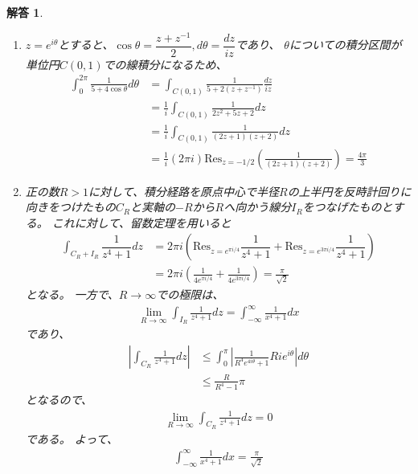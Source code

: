 \documentclass{ltjsarticle}
\newtheorem{ans}{解答}
\begin{document}
\begin{ans}
    \begin{enumerate}
        \item $z=e^{i\theta}$とすると、$\cos\theta=\dfrac{z+z^{-1}}{2}, d\theta=\dfrac{dz}{iz}$であり、
        $\theta$についての積分区間が単位円$C(0,1)$での線積分になるため、
        \begin{align*}
            \displaystyle\int^{2\pi}_0\frac{1}{5+4\cos\theta}d\theta
            &=\int_{C(0,1)}\frac{1}{5+2(z+z^{-1})}\frac{dz}{iz}\\
            &=\frac{1}{i}\int_{C(0,1)}\frac{1}{2z^2+5z+2}dz\\
            &=\frac{1}{i}\int_{C(0,1)}\frac{1}{(2z+1)(z+2)}dz\\
            &=\frac{1}{i}(2\pi i)\mathrm{Res}_{z=-1/2}(\frac{1}{(2z+1)(z+2)})=\frac{4\pi}{3}
        \end{align*}
        \item 正の数$R>1$に対して、積分経路を原点中心で半径$R$の上半円を反時計回りに向きをつけたもの$C_R$と実軸の$-R$から$R$へ向かう線分$I_R$をつなげたものとする。
        これに対して、留数定理を用いると
        \begin{align*}
            \int_{C_R+I_R}\dfrac{1}{z^4+1}dz&=2\pi i\left(\mathrm{Res}_{z=e^{\pi i/4}}\dfrac{1}{z^4+1}+\mathrm{Res}_{z=e^{3\pi i/4}}\dfrac{1}{z^4+1}\right)\\
            &=2\pi i(\frac{1}{4e^{\pi i/4}}+\frac{1}{4e^{3\pi i/4}})=\frac{\pi}{\sqrt{2}}
        \end{align*}
        となる。
        一方で、$R\to\infty$での極限は、
        \begin{align*}
            \lim_{R\to\infty}\int_{I_R}\frac{1}{z^4+1}dz=\int_{-\infty}^{\infty}\frac{1}{x^4+1}dx
        \end{align*}
        であり、
        \begin{align*}
            \left\lvert\int_{C_R}\frac{1}{z^4+1}dz\right\rvert
            &\leq\int_0^\pi\left\lvert\frac{1}{R^4e^{4i\theta}+1}Rie^{i\theta}\right\rvert d\theta\\
            &\leq\frac{R}{R^4-1}\pi
        \end{align*}
        となるので、
        \begin{align*}
            \lim_{R\to\infty}\int_{C_R}\frac{1}{z^4+1}dz=0
        \end{align*}
        である。
        よって、
        \begin{align*}
            \int_{-\infty}^\infty\frac{1}{x^4+1}dx=\frac{\pi}{\sqrt{2}}
        \end{align*}
    \end{enumerate}
\end{ans}
\end{document}
